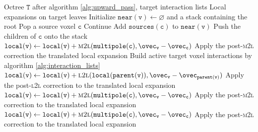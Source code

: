 \begin{algorithm}[h]
  \caption{Downward pass with \textsc{m2l} and \textsc{l2l}}
  \label{alg:downward_pass}
  \begin{algorithmic}
    \Require Octree $\mathtt{T}$ after algorithm \ref{alg:upward_pass}, target interaction lists
    \Ensure Local expansions on target leaves
        \State Initialize $\mathtt{near}(\mathtt{v})\gets\varnothing$ and a stack containing the root
          \State Pop a source voxel $\mathtt{c}$
            \State Continue
          \EndIf
            \State Add $\mathtt{sources}(\mathtt{c})$ to $\mathtt{near}(\mathtt{v})$
            \State Push the children of $\mathtt{c}$ onto the stack
          \Else
            \State $\mathtt{local}(\mathtt{v})\gets\mathtt{local}(\mathtt{v}) + \textsc{m2l}(\mathtt{multipole}(\mathtt{c}), \ovec_{\mathtt{v}}-\ovec_{\mathtt{c}})$
            \State Apply the post-\textsc{m2l} correction the translated local expansion
          \EndIf
        \EndWhile
      \EndFor
      \State \Return
    \EndIf
    \State Build active target voxel interactions by algorithm \ref{alg:interaction_lists}
          \State $\mathtt{local}(\mathtt{v})\gets\mathtt{local}(\mathtt{v}) + \textsc{l2l}(\mathtt{local}(\mathtt{parent}(\mathtt{v})),\ovec_{\mathtt{v}}-\ovec_{\mathtt{parent}(\mathtt{v})})$
          \State Apply the post-\textsc{l2l} correction to the translated local expansion
        \EndIf
          \State $\mathtt{local}(\mathtt{v})\gets\mathtt{local}(\mathtt{v}) + \textsc{m2l}(\mathtt{multipole}(\mathtt{c}),\ovec_{\mathtt{v}}-\ovec_{\mathtt{c}})$
          \State Apply the post-\textsc{m2l} correction to the translated local expansion
        \EndFor
      \EndFor
    \EndFor
        \State $\mathtt{local}(\mathtt{v})\gets\mathtt{local}(\mathtt{v}) + \textsc{m2l}(\mathtt{multipole}(\mathtt{c}),\ovec_{\mathtt{v}}-\ovec_{\mathtt{c}})$
        \State Apply the post-\textsc{m2l} correction to the translated local expansion
      \EndFor
    \EndFor
  \end{algorithmic}
\end{algorithm}
